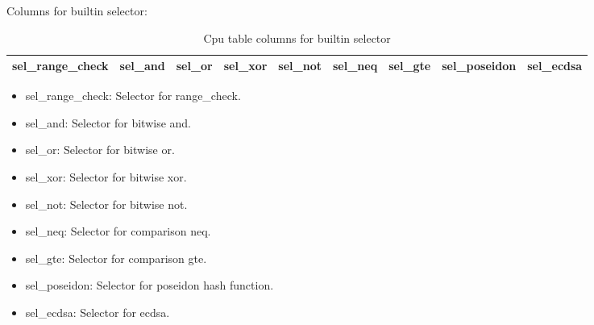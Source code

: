 Columns for builtin selector:
\begin{table}[!ht]
    \centering
    \begin{tabular}{|c|c|c|c|c|c|c|c|c|}
        \hline
        sel\_range\_check & sel\_and & sel\_or & sel\_xor & sel\_not & sel\_neq & sel\_gte & sel\_poseidon & sel\_ecdsa \\
        \hline
    \end{tabular}
    \caption{Cpu table columns for builtin selector}
    \label{table:cpu-columns-builtin-selector}
\end{table}

\begin{itemize}
    \item sel\_range\_check: Selector for range\_check.
    \item sel\_and: Selector for bitwise and.
    \item sel\_or: Selector for bitwise or.
    \item sel\_xor: Selector for bitwise xor.
    \item sel\_not: Selector for bitwise not.
    \item sel\_neq: Selector for comparison neq.
    \item sel\_gte: Selector for comparison gte.
    \item sel\_poseidon: Selector for poseidon hash function.
    \item sel\_ecdsa: Selector for ecdsa.
\end{itemize}
